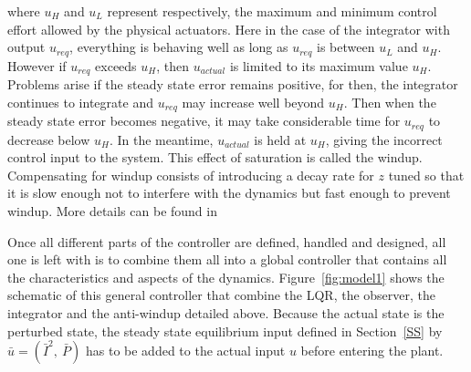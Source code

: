 \documentclass[12pt]{iopart}
\begin{document}
where $u_H$ and $u_L$ represent respectively, the maximum and minimum control effort allowed by the physical actuators.
Here in the case of the integrator with output $u_{req}$, everything is behaving well as long as $u_{req}$ is between $u_L$ and $u_H$. However if $u_{req}$ exceeds $u_H$, then $u_{actual}$ is limited to its maximum value $u_H$. Problems arise if the steady state error remains positive, for then, the integrator continues to integrate and $u_{req}$ may increase well beyond $u_H$. Then when the steady state error becomes negative, it may take considerable time for $u_{req}$ to decrease below $u_H$. In the meantime, $u_{actual}$ is held at $u_H$, giving the incorrect control input to the system.
This effect of saturation is called the windup.  
Compensating for windup consists of introducing a decay rate for $z$ tuned so that it is slow enough not to interfere with the dynamics but fast enough to prevent windup. More details can be found in \cite{AandM, Lewis}

Once all different parts of the controller are defined, handled and designed, all one is left with is to combine them all into a global controller that contains all the characteristics and aspects of the dynamics.
Figure~\ref{fig:model1} shows the schematic of this general controller that combine the LQR, the observer, the integrator and the anti-windup detailed above. Because the actual state is the perturbed state, the steady state equilibrium input defined in Section~\ref{SS} by $\bar{u} = \left( \bar{I}^{2}, \   \bar{P} \right)$ has to be added to the actual input $u$ before entering the plant.
\end{document}
